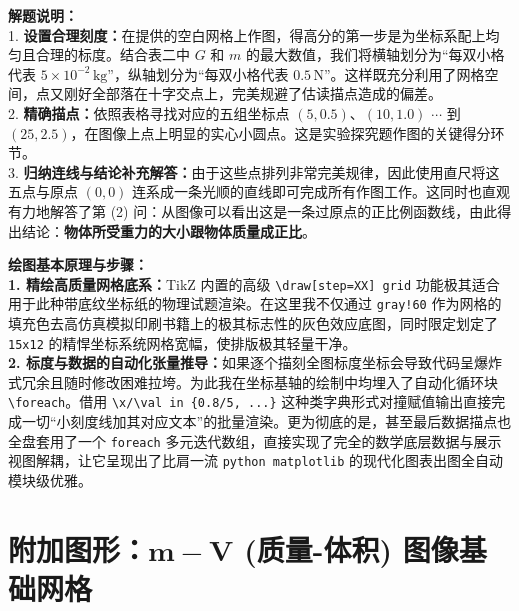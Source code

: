 \vspace{0.6cm}

{\small\color{gray}
\textbf{解题说明：}\\
1. \textbf{设置合理刻度：}在提供的空白网格上作图，得高分的第一步是为坐标系配上均匀且合理的标度。结合表二中 $G$ 和 $m$ 的最大数值，我们将横轴划分为“每双小格代表 $5\times 10^{-2}\,\text{kg}$”，纵轴划分为“每双小格代表 $0.5\,\text{N}$”。这样既充分利用了网格空间，点又刚好全部落在十字交点上，完美规避了估读描点造成的偏差。\\
2. \textbf{精确描点：}依照表格寻找对应的五组坐标点 $(5, 0.5)、(10, 1.0)$ $\cdots$ 到 $(25, 2.5)$，在图像上点上明显的实心小圆点。这是实验探究题作图的关键得分环节。\\
3. \textbf{归纳连线与结论补充解答：}由于这些点排列非常完美规律，因此使用直尺将这五点与原点 $(0,0)$ 连系成一条光顺的直线即可完成所有作图工作。这同时也直观有力地解答了第 (2) 问：从图像可以看出这是一条过原点的正比例函数线，由此得出结论：\textbf{物体所受重力的大小跟物体质量成正比}。
}

\vspace{0.6cm}

{\small\color{blue!70!black}
\textbf{绘图基本原理与步骤：}\\
\textbf{1. 精绘高质量网格底系：}TikZ 内置的高级 \texttt{\textbackslash draw[step=XX] grid} 功能极其适合用于此种带底纹坐标纸的物理试题渲染。在这里我不仅通过 \texttt{gray!60} 作为网格的填充色去高仿真模拟印刷书籍上的极其标志性的灰色效应底图，同时限定划定了 \texttt{15x12} 的精悍坐标系统网格宽幅，使排版极其轻量干净。\\
\textbf{2. 标度与数据的自动化张量推导：}如果逐个描刻全图标度坐标会导致代码呈爆炸式冗余且随时修改困难拉垮。为此我在坐标基轴的绘制中均埋入了自动化循环块 \texttt{\textbackslash foreach}。借用 \texttt{\textbackslash x/\textbackslash val in \{0.8/5, ...\}} 这种类字典形式对撞赋值输出直接完成一切“小刻度线加其对应文本”的批量渲染。更为彻底的是，甚至最后数据描点也全盘套用了一个 \texttt{foreach} 多元迭代数组，直接实现了完全的数学底层数据与展示视图解耦，让它呈现出了比肩一流 \texttt{python matplotlib} 的现代化图表出图全自动模块级优雅。
}



\section{附加图形：$\boldsymbol{m-V}$ (质量-体积) 图像基础网格}

